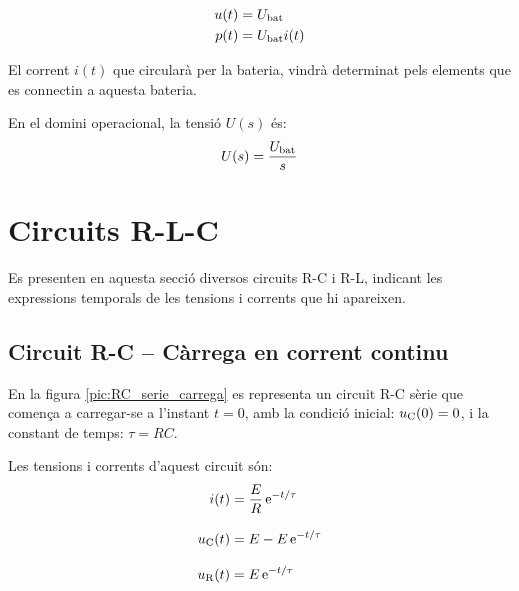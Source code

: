\hfill
\begin{minipage}[b]{5cm}
    
    \label{pic:bat}
\end{minipage}
\hfill
\begin{minipage}[b][3cm][t]{8cm}
   \begin{align}
      u(t) &= U_\mathrm{bat} \\  p(t) &= U_\mathrm{bat} i(t)
   \end{align}
\end{minipage}


El corrent $i(t)$ que circularà per la bateria, vindrà determinat
pels elements que es connectin a aquesta bateria.

 En el domini operacional, la
tensió $U(s)$ és:
\begin{equation}
   U(s) = \frac{U_\mathrm{bat}}{s}
\end{equation}


\section{Circuits R-L-C}

Es presenten en aquesta secció diversos circuits R-C i R-L, indicant les expressions temporals de les tensions i corrents que hi apareixen.

\subsection{Circuit R-C -- Càrrega en corrent continu}\label{sec:RC-carrega}

En la figura \vref{pic:RC_serie_carrega} es representa un circuit R-C sèrie que comença a carregar-se a l'instant $t=0$, amb la condició inicial: $u_\mathrm{C}(0) = 0$, i la constant de temps: $\tau = R C$.
\begin{center}
    
    \label{pic:RC_serie_carrega}
\end{center}

Les tensions i corrents d'aquest circuit són:
\begin{align}
    i(t) &= \frac{E}{R}\,\mathrm{e}^{-t/\tau}\label{eq:RC-carrega} \\[3mm]
    u_\mathrm{C}(t) &= E  - E\, \mathrm{e}^{-t/\tau}  \\[3mm]
    u_\mathrm{R}(t) &= E\,\mathrm{e}^{-t/\tau}
\end{align}

